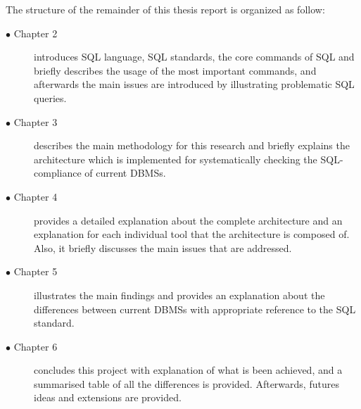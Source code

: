  The structure of the remainder of this thesis report is organized as follow:
 \begin{description}
   \item[$\bullet$ Chapter 2] introduces SQL language, SQL standards, the core commands of SQL and briefly describes the usage of the most important commands, and afterwards the main issues are introduced by illustrating problematic SQL queries. 
   
	\item[$\bullet$ Chapter 3] describes the main methodology for this research and briefly explains the architecture which is implemented for systematically checking the SQL-compliance of current DBMSs.
   
   \item[$\bullet$ Chapter 4] provides a detailed explanation about the complete architecture and an explanation for each individual tool that the architecture is composed of. Also, it briefly discusses the main issues that  are  addressed.

  \item[$\bullet$ Chapter 5] illustrates the main findings and provides an explanation about the differences between current DBMSs with appropriate reference to the SQL standard. 

  \item[$\bullet$ Chapter 6] concludes this project with explanation of what is been achieved, and a summarised table of all the differences is provided. Afterwards, futures ideas and extensions are provided.  
   
\end{description} 

 
 
